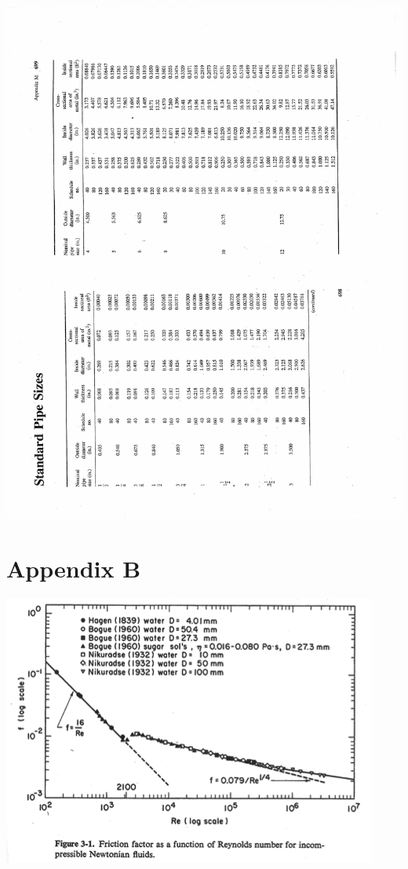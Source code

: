 \documentclass[paper=a4, fontsize=12pt]{scrartcl} %
\numberwithin{equation}{section} %
\numberwithin{figure}{section} %
\numberwithin{table}{section} %
\begin{document}
 \includegraphics[scale=.90]{StandardPipeSizes.pdf}
 
 \newpage

\section*{Appendix B}

 \includegraphics[scale=0.9]{Figure3-1.png}
 
\end{document}
